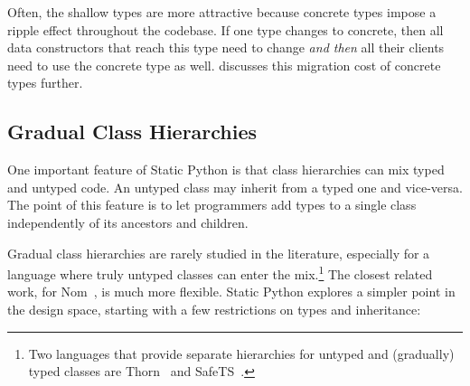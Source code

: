 \documentclass[english,cleveref,submission]{programming}
\newcommand{\SP}{Static Python}
\newcommand{\code}[1]{\texttt{#1}}
\begin{document}

Often, the shallow types are more attractive because concrete types impose
a ripple effect throughout the codebase.
If one type changes to concrete, then all data constructors that reach this type need
to change \emph{and then} all their clients need to use the concrete type as well.
 discusses this migration cost of concrete types further.


\subsection{Gradual Class Hierarchies}
\label{s:inheritance}

One important feature of \SP{} is that class hierarchies can
mix typed and untyped code.
An untyped class may inherit from a typed one and vice-versa.
The point of this feature is to let programmers add types to a single class
independently of its ancestors and children.


Gradual class hierarchies are rarely studied in the literature, especially
for a language where truly untyped classes can enter the mix.\footnote{Two
languages that provide separate hierarchies for untyped and (gradually) typed
classes are Thorn~\cite{wzlov-popl-2010} and SafeTS~\cite{rsfbv-popl-2015}.}
The closest related work, for Nom~\cite{mt-oopsla-2017}, is much more flexible.
\SP{} explores a simpler point in the design space, starting with
a few restrictions on types and inheritance:
\end{document}
